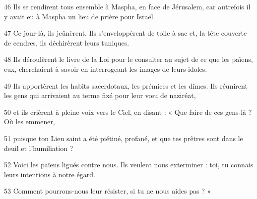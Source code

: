 
46 Ils se rendirent tous ensemble à Maspha, en face de Jérusalem, car autrefois il y avait eu à Maspha un lieu de prière pour Israël.

47 Ce jour-là, ils jeûnèrent. Ils s’enveloppèrent de toile à sac et, la tête couverte de cendres, ils déchirèrent leurs tuniques.

48 Ils déroulèrent le livre de la Loi pour le consulter au sujet de ce que les païens, eux, cherchaient à savoir en interrogeant les images de leurs idoles.

49 Ils apportèrent les habits sacerdotaux, les prémices et les dîmes. Ils réunirent les gens qui arrivaient au terme fixé pour leur vœu de naziréat,

50 et ils crièrent à pleine voix vers le Ciel, en disant : « Que faire de ces gens-là ? Où les emmener,

51 puisque ton Lieu saint a été piétiné, profané, et que tes prêtres sont dans le deuil et l’humiliation ?

52 Voici les païens ligués contre nous. Ils veulent nous exterminer : toi, tu connais leurs intentions à notre égard.

53 Comment pourrons-nous leur résister, si tu ne nous aides pas ? »
